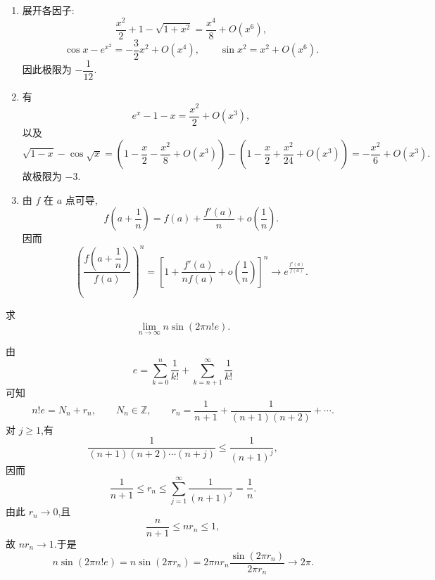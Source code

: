 \begin{solution}
    \leavevmode
    \begin{enumerate}
        \item 展开各因子:
              \[
                  \dfrac{x^2}{2}+1-\sqrt{1+x^2}
                  =\dfrac{x^4}{8}+O(x^6),
              \]
              \[
                  \cos x-e^{x^2}=-\dfrac{3}{2}x^2+O(x^4),
                  \qquad
                  \sin x^2=x^2+O(x^6).
              \]
              因此极限为 $-\dfrac{1}{12}$.
        \item 有
              \[
                  e^x-1-x=\dfrac{x^2}{2}+O(x^3),
              \]
              以及
              \[
                  \sqrt{1-x}-\cos\sqrt{x}
                  =\left(1-\dfrac{x}{2}-\dfrac{x^2}{8}+O(x^3)\right)
                  -\left(1-\dfrac{x}{2}+\dfrac{x^2}{24}+O(x^3)\right)
                  =-\dfrac{x^2}{6}+O(x^3).
              \]
              故极限为 $-3$.
        \item 由 $f$ 在 $a$ 点可导,
              \[
                  f\left(a+\dfrac{1}{n}\right)
                  =f(a)+\dfrac{f'(a)}{n}+o\left(\dfrac{1}{n}\right).
              \]
              因而
              \[
                  \left(\dfrac{f\left(a+\dfrac{1}{n}\right)}{f(a)}\right)^n
                  =\left[1+\dfrac{f'(a)}{nf(a)}+o\left(\dfrac{1}{n}\right)\right]^n
                  \longrightarrow e^{\frac{f'(a)}{f(a)}}.
              \]
    \end{enumerate}
\end{solution}

\begin{example}
    求
    \[
        \displaystyle\lim\limits_{n\to\infty}n\sin(2\pi n!e).
    \]
\end{example}
\exampleblank

\begin{solution}
    由
    \[
        e=\sum\limits_{k=0}^{n}\dfrac{1}{k!}
        +\sum\limits_{k=n+1}^{\infty}\dfrac{1}{k!}
    \]
    可知
    \[
        n!e=N_n+r_n,
        \qquad
        N_n\in\mathbb{Z},
        \qquad
        r_n=\dfrac{1}{n+1}+\dfrac{1}{(n+1)(n+2)}+\cdots.
    \]
    对 $j\geq1$,有
    \[
        \dfrac{1}{(n+1)(n+2)\cdots(n+j)}
        \leq\dfrac{1}{(n+1)^j},
    \]
    因而
    \[
        \dfrac{1}{n+1}\leq r_n
        \leq\sum\limits_{j=1}^{\infty}\dfrac{1}{(n+1)^j}
        =\dfrac{1}{n}.
    \]
    由此 $r_n\to0$,且
    \[
        \dfrac{n}{n+1}\leq nr_n\leq1,
    \]
    故 $nr_n\to1$.于是
    \[
        n\sin(2\pi n!e)
        =n\sin(2\pi r_n)
        =2\pi nr_n\dfrac{\sin(2\pi r_n)}{2\pi r_n}
        \longrightarrow2\pi.
    \]
\end{solution}

